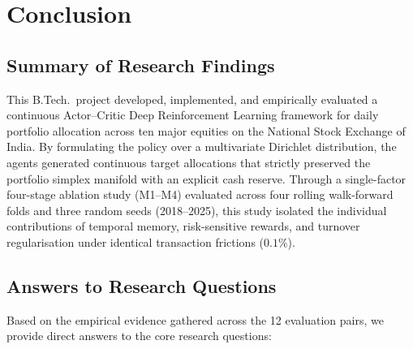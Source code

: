 \chapter{Conclusion}
\label{ch:conclusion}

\section{Summary of Research Findings}
This B.Tech.\ project developed, implemented, and empirically evaluated a continuous Actor--Critic Deep Reinforcement Learning framework for daily portfolio allocation across ten major equities on the National Stock Exchange of India. By formulating the policy over a multivariate Dirichlet distribution, the agents generated continuous target allocations that strictly preserved the portfolio simplex manifold with an explicit cash reserve. Through a single-factor four-stage ablation study (M1--M4) evaluated across four rolling walk-forward folds and three random seeds (2018--2025), this study isolated the individual contributions of temporal memory, risk-sensitive rewards, and turnover regularisation under identical transaction frictions ($0.1\%$).

\section{Answers to Research Questions}
Based on the empirical evidence gathered across the 12 evaluation pairs, we provide direct answers to the core research questions:

